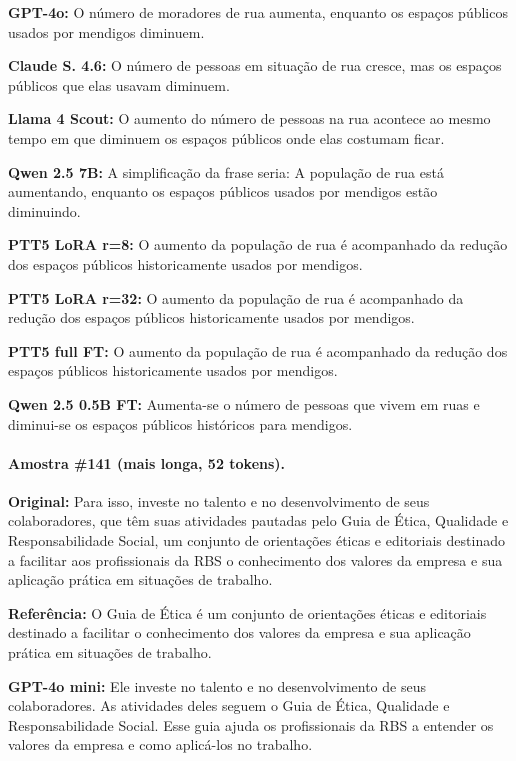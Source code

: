 \documentclass[a4paper, twocolumn, 11pt, twoside]{article}
\begin{document}
\textbf{GPT-4o:} O número de moradores de rua aumenta, enquanto os espaços públicos usados por mendigos diminuem.

\textbf{Claude S. 4.6:} O número de pessoas em situação de rua cresce, mas os espaços públicos que elas usavam diminuem.

\textbf{Llama 4 Scout:} O aumento do número de pessoas na rua acontece ao mesmo tempo em que diminuem os espaços públicos onde elas costumam ficar.

\textbf{Qwen 2.5 7B:} A simplificação da frase seria: A população de rua está aumentando, enquanto os espaços públicos usados por mendigos estão diminuindo.

\textbf{PTT5 LoRA r=8:} O aumento da população de rua é acompanhado da redução dos espaços públicos historicamente usados por mendigos.

\textbf{PTT5 LoRA r=32:} O aumento da população de rua é acompanhado da redução dos espaços públicos historicamente usados por mendigos.

\textbf{PTT5 full FT:} O aumento da população de rua é acompanhado da redução dos espaços públicos historicamente usados por mendigos.

\textbf{Qwen 2.5 0.5B FT:} Aumenta-se o número de pessoas que vivem em ruas e diminui-se os espaços públicos históricos para mendigos.

\bigskip
\paragraph*{Amostra \#141 (mais longa, 52 tokens).}

\textbf{Original:} Para isso, investe no talento e no desenvolvimento de seus colaboradores, que têm suas atividades pautadas pelo Guia de Ética, Qualidade e Responsabilidade Social, um conjunto de orientações éticas e editoriais destinado a facilitar aos profissionais da RBS o conhecimento dos valores da empresa e sua aplicação prática em situações de trabalho.

\textbf{Referência:} O Guia de Ética é um conjunto de orientações éticas e editoriais destinado a facilitar o conhecimento dos valores da empresa e sua aplicação prática em situações de trabalho.

\textbf{GPT-4o mini:} Ele investe no talento e no desenvolvimento de seus colaboradores. As atividades deles seguem o Guia de Ética, Qualidade e Responsabilidade Social. Esse guia ajuda os profissionais da RBS a entender os valores da empresa e como aplicá-los no trabalho.
\end{document}
